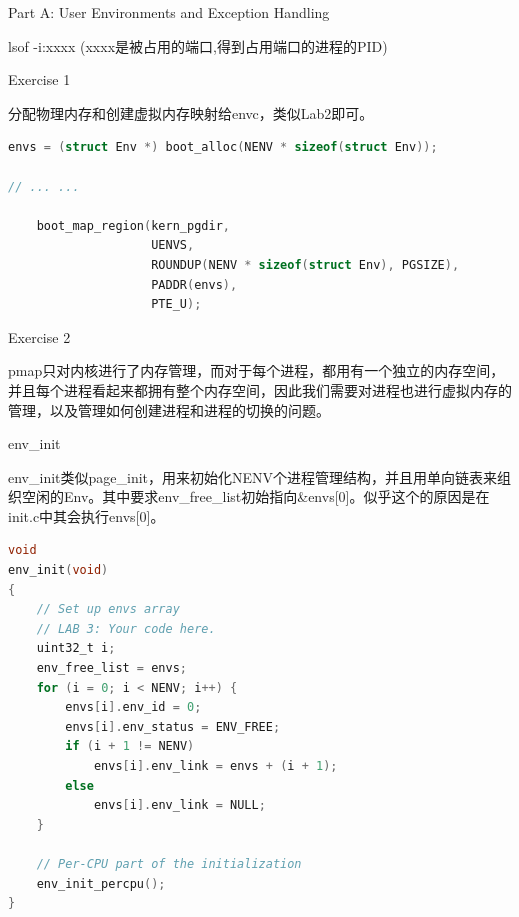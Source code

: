 \documentclass[GBK,winfonts,a4paper,10pt]{ctexart}
\begin{document}
\begin{section}{ Part A: User Environments and Exception Handling }
\par
lsof -i:xxxx    (xxxx是被占用的端口,得到占用端口的进程的PID)

\begin{subsection}{ Exercise 1 }
\par
分配物理内存和创建虚拟内存映射给envc，类似Lab2即可。
\begin{lstlisting}[language=C]
	envs = (struct Env *) boot_alloc(NENV * sizeof(struct Env));

// ... ...

    boot_map_region(kern_pgdir,
                    UENVS,
                    ROUNDUP(NENV * sizeof(struct Env), PGSIZE),
                    PADDR(envs),
                    PTE_U);
\end{lstlisting}
\end{subsection}

\begin{subsection}{ Exercise 2 }
\par
pmap只对内核进行了内存管理，而对于每个进程，都用有一个独立的内存空间，并且每个进程看起来都拥有整个内存空间，因此我们需要对进程也进行虚拟内存的管理，以及管理如何创建进程和进程的切换的问题。

\begin{subsubsection}{env\_init}
\par
env\_init类似page\_init，用来初始化NENV个进程管理结构，并且用单向链表来组织空闲的Env。其中要求env\_free\_list初始指向\&envs[0]。似乎这个的原因是在init.c中其会执行envs[0]。
\begin{lstlisting}[language=C]
void
env_init(void)
{
	// Set up envs array
	// LAB 3: Your code here.
    uint32_t i;
    env_free_list = envs;
    for (i = 0; i < NENV; i++) {
        envs[i].env_id = 0;
        envs[i].env_status = ENV_FREE;
        if (i + 1 != NENV)
            envs[i].env_link = envs + (i + 1);
        else 
            envs[i].env_link = NULL;
    }

	// Per-CPU part of the initialization
	env_init_percpu();
}
\end{lstlisting}
\end{subsubsection}


\end{subsection}
\end{section}
\end{document}
